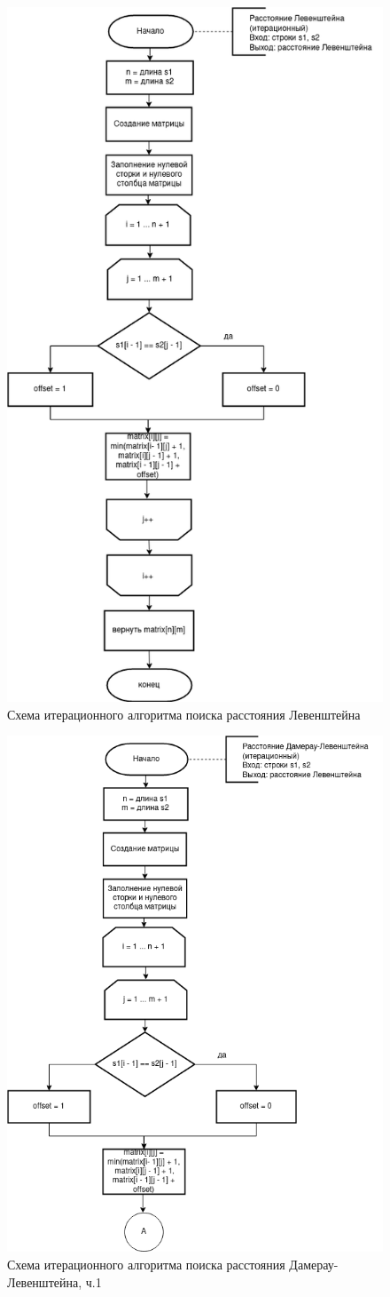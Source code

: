 \documentclass[12pt]{report}
\begin{document}
	\begin{figure}[H]
		\centering
		\includegraphics[width=0.6\linewidth]{Lev}
		\caption{Схема итерационного алгоритма поиска расстояния Левенштейна}
		\label{fig:schema_bucket_1}
	\end{figure}
	
	\begin{figure}[H]
		\centering
		\includegraphics[width=0.8\linewidth]{DamLev_1}
		\caption{Схема итерационного алгоритма поиска расстояния Дамерау-Левенштейна, ч.1}
		\label{fig:schema_bucket_2}
	\end{figure}
	
\end{document}
